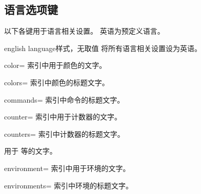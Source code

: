 \clearpage
\subsection{语言选项键}

以下各键用于语言相关设置。
英语为预定义语言。

\begin{docTcbKey}{english language}{}{样式，无取值}
  将所有语言相关设置设为英语。
\end{docTcbKey}

\begin{langTcbKey}{color}{=}{}
  索引中用于颜色的文字。
\end{langTcbKey}

\begin{langTcbKey}{colors}{=}{}
  索引中颜色的标题文字。
\end{langTcbKey}

\begin{langTcbKey}[][doc new={2022-06-20}]{commands}{=}{}
  索引中命令的标题文字。
\end{langTcbKey}

\begin{langTcbKey}[][doc new={2015-01-08}]{counter}{=}{}
  索引中用于计数器的文字。
\end{langTcbKey}

\begin{langTcbKey}[][doc new={2015-01-08}]{counters}{=}{}
  索引中计数器的标题文字。
\end{langTcbKey}

\begin{langTcbKeys}[
    doc name              = default,
    doc parameter eq meta = text,
    doc description init  = default,
    doc new               = 2026-05-26
  ]{}
  用于  等的文字。
\end{langTcbKeys}

\begin{langTcbKey}{environment}{=}{}
  索引中用于环境的文字。
\end{langTcbKey}

\begin{langTcbKey}{environments}{=}{}
  索引中环境的标题文字。
\end{langTcbKey}

